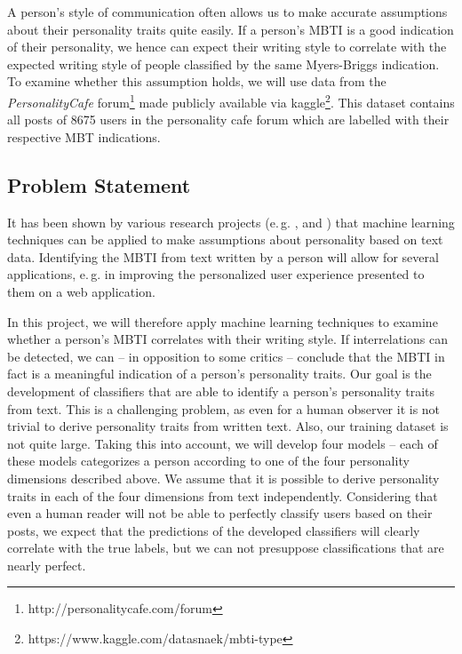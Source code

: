 \documentclass[12pt]{elsarticle}
\begin{document}
A person's style of communication often allows us to make accurate assumptions about their personality traits quite easily. If a person's MBTI is a good indication of their personality, we hence can expect their writing style to correlate with the expected writing style of people classified by the same Myers-Briggs indication. To examine whether this assumption holds, we will use data from the \textit{PersonalityCafe} forum\footnote{http://personalitycafe.com/forum} made publicly available via kaggle\footnote{https://www.kaggle.com/datasnaek/mbti-type}. This dataset contains all posts of 8675 users in the personality cafe forum which are labelled with their respective MBT indications. 



\subsection{Problem Statement}
It has been shown by various research projects (e.\,g. \cite{golbeck}, \cite{dutch} and \cite{dl}) that machine learning techniques can be applied to make assumptions about personality based on text data. Identifying the MBTI from text written by a person will allow for several applications, e.\,g. in improving the personalized user experience presented to them on a web application.


In this project, we will therefore apply machine learning techniques to examine whether a person's MBTI correlates with their writing style. If interrelations can be detected, we can -- in opposition to some critics -- conclude that the MBTI in fact is a meaningful indication of a person's personality traits. Our goal is the development of classifiers that are able to identify a person's personality traits from text. This is a challenging problem, as even for a human observer it is not trivial to derive personality traits from written text. Also, our training dataset is not quite large. Taking this into account, we will develop four models -- each of these models categorizes a person according to one of the four personality dimensions described above. We assume that it is possible to derive personality traits in each of the four dimensions from text independently. Considering that even a human reader will not be able to perfectly classify users based on their posts, we expect that the predictions of the developed classifiers will clearly correlate with the true labels, but we can not presuppose classifications that are nearly perfect.
\end{document}
